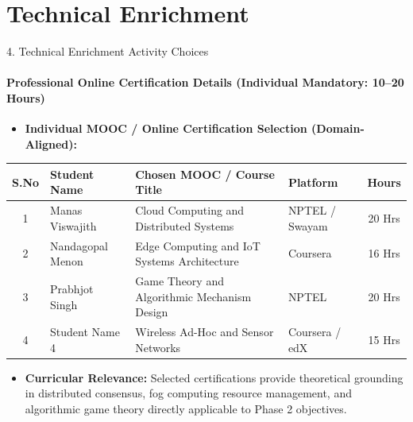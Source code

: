 \documentclass[aspectratio=169, 11pt]{beamer}
\begin{document}
\section{Technical Enrichment}
\begin{frame}{4. Technical Enrichment Activity Choices}
    \framesubtitle{Professional Online Certification Details (Individual Mandatory: 10--20 Hours)}
    \begin{itemize}
        \item \textbf{Individual MOOC / Online Certification Selection (Domain-Aligned):}
    \end{itemize}
    \vspace{-0.15cm}
    \begin{table}
        \centering
        \footnotesize
        \renewcommand{\arraystretch}{1.18}
        \begin{tabular}{|c|p{2.8cm}|p{5.2cm}|p{2.3cm}|c|}
            \hline
            \textbf{S.No} & \textbf{Student Name} & \textbf{Chosen MOOC / Course Title} & \textbf{Platform} & \textbf{Hours} \\
            \hline
            1 & Manas Viswajith & Cloud Computing and Distributed Systems & NPTEL / Swayam & 20 Hrs \\
            \hline
            2 & Nandagopal Menon & Edge Computing and IoT Systems Architecture & Coursera & 16 Hrs \\
            \hline
            3 & Prabhjot Singh & Game Theory and Algorithmic Mechanism Design & NPTEL & 20 Hrs \\
            \hline
            4 & Student Name 4 & Wireless Ad-Hoc and Sensor Networks & Coursera / edX & 15 Hrs \\
            \hline
        \end{tabular}
    \end{table}
    \vspace{0.15cm}
    \begin{itemize}\footnotesize
        \item \textbf{Curricular Relevance:} Selected certifications provide theoretical grounding in distributed consensus, fog computing resource management, and algorithmic game theory directly applicable to Phase 2 objectives.
    \end{itemize}
\end{frame}
\end{document}

